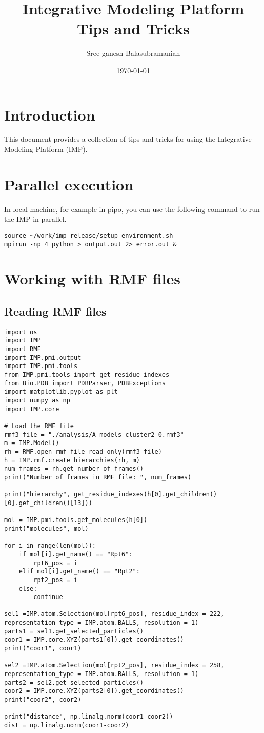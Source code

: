 \documentclass{article}
\title{Integrative Modeling Platform Tips and Tricks}
\author{Sree ganesh Balasubramanian}
\date{\today}
\begin{document}
\maketitle

\section{Introduction}
This document provides a collection of tips and tricks for using the Integrative Modeling Platform (IMP).

\section{Parallel execution}
In local machine, for example in pipo, you can use the following command to run the IMP in parallel.
\begin{verbatim}
source ~/work/imp_release/setup_environment.sh
mpirun -np 4 python > output.out 2> error.out &
\end{verbatim}

\section{Working with RMF files}
\subsection{Reading RMF files}
\begin{verbatim}
import os
import IMP
import RMF
import IMP.pmi.output
import IMP.pmi.tools 
from IMP.pmi.tools import get_residue_indexes
from Bio.PDB import PDBParser, PDBExceptions
import matplotlib.pyplot as plt
import numpy as np
import IMP.core

# Load the RMF file
rmf3_file = "./analysis/A_models_cluster2_0.rmf3"
m = IMP.Model()
rh = RMF.open_rmf_file_read_only(rmf3_file)
h = IMP.rmf.create_hierarchies(rh, m)
num_frames = rh.get_number_of_frames()
print("Number of frames in RMF file: ", num_frames)

print("hierarchy", get_residue_indexes(h[0].get_children()[0].get_children()[13]))

mol = IMP.pmi.tools.get_molecules(h[0])
print("molecules", mol)

for i in range(len(mol)):
    if mol[i].get_name() == "Rpt6":
        rpt6_pos = i
    elif mol[i].get_name() == "Rpt2":
        rpt2_pos = i
    else:
        continue
        
sel1 =IMP.atom.Selection(mol[rpt6_pos], residue_index = 222, representation_type = IMP.atom.BALLS, resolution = 1)
parts1 = sel1.get_selected_particles()
coor1 = IMP.core.XYZ(parts1[0]).get_coordinates()
print("coor1", coor1)

sel2 =IMP.atom.Selection(mol[rpt2_pos], residue_index = 258, representation_type = IMP.atom.BALLS, resolution = 1)
parts2 = sel2.get_selected_particles()
coor2 = IMP.core.XYZ(parts2[0]).get_coordinates()
print("coor2", coor2)

print("distance", np.linalg.norm(coor1-coor2))
dist = np.linalg.norm(coor1-coor2)
\end{verbatim}
\end{document}
